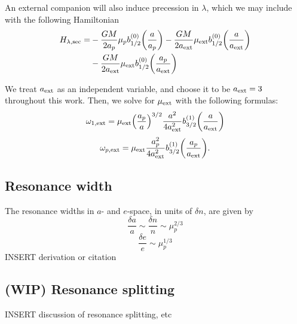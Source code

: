 \documentclass{article}
\newcommand{\note}[1]{{\color{red} #1 }}
\DeclarePairedDelimiter{\p}{(}{)}
\begin{document}
  An external companion will also induce precession in $\lambda$,
  which we may include with the following Hamiltonian
  \begin{align*}
H_{\lambda,\rm sec} =&
  -\frac{GM}{2a_p} \mu_p b_{1/2}^{(0)}\p*{\frac{a}{a_p}}
- \frac{GM}{2a_{\rm ext}} \mu_{\rm ext} b_{1/2}^{(0)}\p*{\frac{a}{a_{\rm ext}}}\\
                      &- \frac{GM}{2a_{\rm ext}} \mu_{\rm ext} b_{1/2}^{(0)}\p*{\frac{a_p}{a_{\rm ext}}}
  \end{align*}

  We treat $a_{\rm ext}$ as an independent variable, and choose it to be $a_{\rm ext} = 3$
  throughout this work. Then, we solve for $\mu_{\rm ext}$ with the following formulas:
  \[ \omega_{1,\rm ext} = \mu_{\rm ext} \p*{\frac{a_p}{a}}^{3/2} \frac{a^2}{4a_{\rm ext}^2}
    b_{3/2}^{(1)}\p*{\frac{a}{a_{\rm ext}}} \]
  \[ \omega_{p,\rm ext} = \mu_{\rm ext} \frac{a_p^2}{4a_{\rm ext}^2}
    b_{3/2}^{(1)}\p*{\frac{a_p}{a_{\rm ext}}}. \]

\subsection{Resonance width}
The resonance widths in $a$- and $e$-space, in units of $\delta n$, are given by
  \[ \frac{\delta a}{a} \sim \frac{\delta n}{n} \sim \mu_p^{2/3}\]
  \[ \frac{\delta e}{e}\sim \mu_p^{1/3}\]
\note{INSERT derivation or citation}
\subsection{(WIP) Resonance splitting}
\note{INSERT discussion of resonance splitting, etc}
\end{document}
